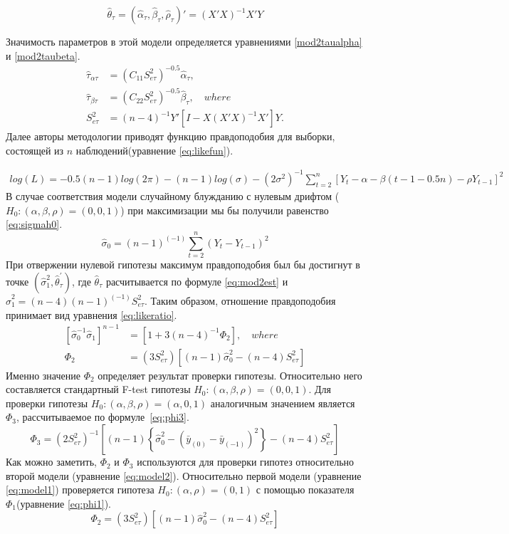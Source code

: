 \documentclass[a4paper,12pt]{article}
\begin{document}
\begin{equation}
  \label{eq:mod2est}
  \hat{\theta}_\tau=(\hat{\alpha}_\tau,\hat{\beta}_\tau,\hat{\rho}_\tau)'=(X'X)^{-1}X'Y
\end{equation}

Значимость параметров в этой модели определяется уравнениями \ref{mod2taualpha} и \ref{mod2taubeta}.
\begin{align}
  \label{mod2taualpha}
  \hat{\tau}_{\alpha\tau}&=(C_{11}S^2_{e\tau})^{-0.5}\hat{\alpha}_\tau,\\
  \label{mod2taubeta}
  \hat{\tau}_{\beta\tau}&=(C_{22}S^2_{e\tau})^{-0.5}\hat{\beta}_\tau,\quad where\\
  S^2_{e\tau}&=(n-4)^{-1}Y'\left[I-X(X'X)^{-1}X'\right]Y.
\end{align}
Далее авторы методологии приводят функцию правдоподобия для выборки, состоящей из $n$ наблюдений(уравнение \ref{eq:likefun}).

\begin{align}
\label{eq:likefun}
log{(L)}=-0.5(n-1)log(2\pi)-(n-1)log{(\sigma)}-(2\sigma^2)^{-1}\sum_{t=2}^{n}
\left[Y_t-\alpha-\beta(t-1-0.5n)-\rho Y_{t-1}\right]^2
\end{align}
В случае соответствия модели случайному блужданию с нулевым дрифтом ($H_0:(\alpha,\beta,\rho)=(0,0,1)$) при максимизации мы бы получили равенство \ref{eq:sigmah0}.
\begin{equation}
  \label{eq:sigmah0}
  \hat{\sigma}_0=(n-1)^{(-1)}\sum_{t=2}^n(Y_t-Y_{t-1})^2
\end{equation}
При отвержении нулевой гипотезы максимум правдоподобия был бы достигнут в точке $(\hat{\sigma}_1^2,\hat{\theta}_\tau^{'})$, где $\hat{\theta}_\tau$ расчитывается по формуле \ref{eq:mod2est} и $\hat{\sigma}_1^2=(n-4)(n-1)^{(-1)}S^2_{e\tau}$. Таким образом, отношение правдоподобия принимает вид уравнения \ref{eq:likeratio}.
\begin{align}
  \label{eq:likeratio}
  \left[\hat{\sigma}_0^{-1}\hat{\sigma}_1\right]^{n-1}&=\left[1+3(n-4)^{-1}\Phi_2\right],\quad where\\
  \Phi_2&=(3S^2_{e\tau})\left[(n-1)\hat{\sigma}_0^2-(n-4)S^2_{e\tau}\right]
\end{align}
Именно значение $\Phi_2$ определяет результат проверки гипотезы. Относительно него составляется стандартный F-test гипотезы $H_0:(\alpha,\beta,\rho)=(0,0,1)$. Для проверки гипотезы $H_0:(\alpha,\beta,\rho)=(\alpha,0,1)$ аналогичным значением является~$\Phi_3$, рассчитываемое по формуле~\ref{eq:phi3}.
\begin{equation}
  \label{eq:phi3}
  \Phi_3=(2S_{e\tau}^2)^{-1}
  \left[
    (n-1)
      \left\{
        \hat{\sigma}_0^2-(\bar{y}_{(0)}-\bar{y}_{(-1)})^2
      \right\}
      -(n-4)S^2_{e\tau}
  \right]
\end{equation}
Как можно заметить, $\Phi_2$ и $\Phi_3$ используются для проверки гипотез относительно второй модели (уравнение \ref{eq:model2}). Относительно первой модели (уравнение \ref{eq:model1}) проверяется гипотеза $H_0:(\alpha,\rho)=(0,1)$ с помощью показателя $\Phi_1$(уравнение \ref{eq:phi1}).
\begin{equation}
  \label{eq:phi1}
  \Phi_2=(3S^2_{e\tau})\left[(n-1)\hat{\sigma}_0^2-(n-4)S^2_{e\tau}\right]
\end{equation}
\end{document}
